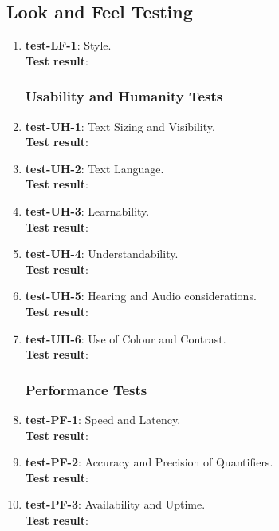 \documentclass[12pt, titlepage]{article}
\begin{document}
\subsection{Look and Feel Testing}
\begin{enumerate}
	\item{\textbf{test-LF-1}}: Style.\\
	\textbf{Test result}:
	
\subsubsection{Usability and Humanity Tests}
	\item{\textbf{test-UH-1}}: Text Sizing and Visibility.\\
	\textbf{Test result}:
	
	\item{\textbf{test-UH-2}}: Text Language.\\
	\textbf{Test result}:
	
	\item{\textbf{test-UH-3}}: Learnability.\\
	\textbf{Test result}:
	
	\item{\textbf{test-UH-4}}: Understandability.\\
	\textbf{Test result}:
	
	\item{\textbf{test-UH-5}}: Hearing and Audio considerations.\\
	\textbf{Test result}:
	
	\item{\textbf{test-UH-6}}: Use of Colour and Contrast.\\
	\textbf{Test result}:
	
\subsubsection{Performance Tests}
	\item{\textbf{test-PF-1}}: Speed and Latency.\\
	\textbf{Test result}:
	
	\item{\textbf{test-PF-2}}: Accuracy and Precision of Quantifiers.\\
	\textbf{Test result}:
	
	\item{\textbf{test-PF-3}}: Availability and Uptime.\\
	\textbf{Test result}:
	

\end{enumerate}
\end{document}

